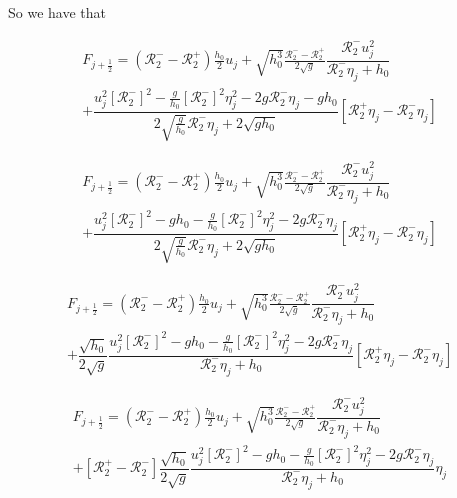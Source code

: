 \documentclass[12pt]{article}
\begin{document}
So we have that

\begin{multline}
F_{j+\frac{1}{2}} = \left( \mathcal{R}_2^-  - \mathcal{R}_2^+ \right) \frac{h_0}{2}u_j + \sqrt{h_0^3}\frac{\mathcal{R}_2^-  - \mathcal{R}_2^+}{2 \sqrt{g}} \dfrac{\mathcal{R}_2^- u_{j}^2}{\mathcal{R}_2^-\eta_{j}  + h_0}  \\
+ \dfrac{u_{j}^2 \left[\mathcal{R}_2^-\right]^2 - \frac{g}{h_0} \left[\mathcal{R}_2^-\right]^2 \eta_{j}^2 - 2 g \mathcal{R}_2^- \eta_{j} - gh_0}{2\sqrt{\frac{g}{h_0}} \mathcal{R}_2^-\eta_{j}  + 2\sqrt{gh_0} } \left [ \mathcal{R}_2^+\eta_j - \mathcal{R}_2^-\eta_j\right ]
\end{multline}

\begin{multline}
F_{j+\frac{1}{2}} = \left( \mathcal{R}_2^-  - \mathcal{R}_2^+ \right) \frac{h_0}{2}u_j + \sqrt{h_0^3}\frac{\mathcal{R}_2^-  - \mathcal{R}_2^+}{2 \sqrt{g}} \dfrac{\mathcal{R}_2^- u_{j}^2}{\mathcal{R}_2^-\eta_{j}  + h_0}  \\
+ \dfrac{u_{j}^2 \left[\mathcal{R}_2^-\right]^2 - gh_0 - \frac{g}{h_0} \left[\mathcal{R}_2^-\right]^2 \eta_{j}^2 - 2 g \mathcal{R}_2^- \eta_{j} }{2\sqrt{\frac{g}{h_0}} \mathcal{R}_2^-\eta_{j}  + 2\sqrt{gh_0} } \left [ \mathcal{R}_2^+\eta_j - \mathcal{R}_2^-\eta_j\right ]
\end{multline}

\begin{multline}
F_{j+\frac{1}{2}} = \left( \mathcal{R}_2^-  - \mathcal{R}_2^+ \right) \frac{h_0}{2}u_j + \sqrt{h_0^3}\frac{\mathcal{R}_2^-  - \mathcal{R}_2^+}{2 \sqrt{g}} \dfrac{\mathcal{R}_2^- u_{j}^2}{\mathcal{R}_2^-\eta_{j}  + h_0}  \\
+ \dfrac{\sqrt{h_0}}{2\sqrt{g}} \dfrac{u_{j}^2 \left[\mathcal{R}_2^-\right]^2 - gh_0 - \frac{g}{h_0} \left[\mathcal{R}_2^-\right]^2 \eta_{j}^2 - 2 g \mathcal{R}_2^- \eta_{j} }{ \mathcal{R}_2^-\eta_{j}  + h_0 } \left [ \mathcal{R}_2^+\eta_j - \mathcal{R}_2^-\eta_j\right ]
\end{multline}

\begin{multline}
F_{j+\frac{1}{2}} = \left( \mathcal{R}_2^-  - \mathcal{R}_2^+ \right) \frac{h_0}{2}u_j + \sqrt{h_0^3}\frac{\mathcal{R}_2^-  - \mathcal{R}_2^+}{2 \sqrt{g}} \dfrac{\mathcal{R}_2^- u_{j}^2}{\mathcal{R}_2^-\eta_{j}  + h_0}  \\
+ \left [ \mathcal{R}_2^+ - \mathcal{R}_2^-\right ] \dfrac{\sqrt{h_0}}{2\sqrt{g}} \dfrac{u_{j}^2 \left[\mathcal{R}_2^-\right]^2 - gh_0 - \frac{g}{h_0} \left[\mathcal{R}_2^-\right]^2 \eta_{j}^2 - 2 g \mathcal{R}_2^- \eta_{j} }{ \mathcal{R}_2^-\eta_{j}  + h_0 }  \eta_j
\end{multline}
\end{document}
